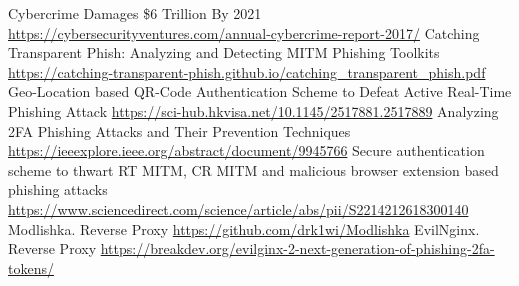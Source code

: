 \documentclass [14pt]{extarticle}
\begin{document}
\newpage
\begin{thebibliography}{1}
 Cybercrime Damages \$6 Trillion By 2021 \url{https://cybersecurityventures.com/annual-cybercrime-report-2017/}
 Catching Transparent Phish: Analyzing and Detecting MITM Phishing Toolkits \url{https://catching-transparent-phish.github.io/catching_transparent_phish.pdf}
 Geo-Location based QR-Code Authentication Scheme to Defeat Active Real-Time Phishing Attack \url{https://sci-hub.hkvisa.net/10.1145/2517881.2517889}
 Analyzing 2FA Phishing Attacks and Their Prevention Techniques \url{https://ieeexplore.ieee.org/abstract/document/9945766}
 Secure authentication scheme to thwart RT MITM, CR MITM and malicious browser extension based phishing attacks \url{https://www.sciencedirect.com/science/article/abs/pii/S2214212618300140} 
 Modlishka. Reverse Proxy \url{https://github.com/drk1wi/Modlishka}
 EvilNginx. Reverse Proxy \url{https://breakdev.org/evilginx-2-next-generation-of-phishing-2fa-tokens/}
\end{thebibliography}
\end{document}
